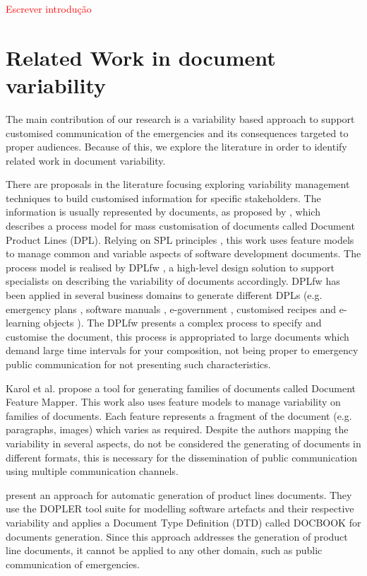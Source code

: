 \label{chapter:related} 
\textcolor{red}{Escrever introdução}
\section{Related Work in document variability}{}


The main contribution of our research is a variability based approach to support customised communication of the emergencies and its consequences targeted to proper audiences. Because of this, we explore the literature in order to identify related work in document variability.

There are proposals in the literature focusing exploring variability management techniques to build customised information for specific stakeholders. The information is usually represented by documents, as proposed by  \cite{penades2010}, which describes a process model for mass customisation of documents called Document Product Lines (DPL). Relying on SPL principles \citep{clements2002}, this work uses feature models \citep{Kang1990} to manage common and variable aspects of software development documents. The process model is realised by  DPLfw \citep{gomez2012dplfw}, a high-level design solution to support specialists on describing the variability of documents accordingly. DPLfw has been applied in several business domains to generate different DPLs (e.g. emergency plans \citep{gomez2012dplfw}, software manuals \citep{penades2012}, e-government \citep{penades2014},  customised recipes \citep{canos2013} and e-learning objects \citep{labib2015}). The DPLfw presents a complex process to specify and customise the document, this process is appropriated to large documents which demand large time intervals for your composition, not being proper to emergency public communication for not presenting such characteristics.

Karol et al. \citep{Karol2010} propose a tool for generating families of documents called Document Feature Mapper. This work also uses feature models to manage variability on families of documents. Each feature represents a fragment of the document (e.g. paragraphs, images) which varies as required. Despite the authors mapping the variability in several aspects, do not be considered the generating of documents in different formats, this is necessary for the dissemination of public communication using multiple communication channels. 

\cite{Rabiser2010} present an approach for automatic generation of product lines documents. They use the DOPLER \citep{rabiser2009} tool suite for modelling software artefacts and their respective variability and applies a Document Type Definition (DTD) called DOCBOOK \citep{walsh1999} for documents generation. Since this approach addresses the generation of product line documents, it cannot be applied to any other domain, such as public communication of emergencies.


